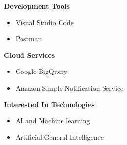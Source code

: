 \documentclass[letterpaper]{deedy-resume} %
\begin{document}
\begin{minipage}[t]{0.33\textwidth}
\vspace{-\topsep}


\textbf{Development Tools}
\vspace{-\topsep}

\begin{itemize}
\setlength\itemsep{-0.5em} %
\item Visual Studio Code
\item Postman
\end{itemize}


\vspace{-\topsep}
\textbf{Cloud Services}
\vspace{-\topsep}

\begin{itemize}
    \setlength\itemsep{-0.5em} %
    \item Google BigQuery
    \item Amazon Simple Notification Service
\end{itemize}



\textbf{Interested In Technologies}
\vspace{-\topsep}

\begin{itemize}
\setlength\itemsep{-0.5em} %
\item AI and Machine learning
\item Artificial General Intelligence
\end{itemize}







\end{minipage} %
\hfill
\end{document}
